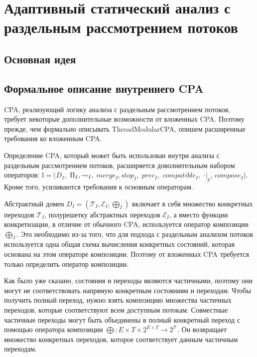 \newcommand{\IR}{IR}
\newcommand{\epp}{\mathrel{\bigoplus}}
\newcommand{\conctm}[1]{\conc{#1}_{TM}}

\section{Адаптивный статический анализ с раздельным рассмотрением потоков}
\label{sect_tm_with_io}

\subsection{Основная идея}

\subsection{Формальное описание внутреннего CPA}
 
CPA, реализующий логику анализа с раздельным рассмотрением потоков, требует некоторые дополнительные возможности от вложенных CPA. 
Поэтому прежде, чем формально описывать ThreadModularCPA, опишем расширенные требования ко вложенным CPA.
 
Определение CPA, который может быть использован внутри анализа с раздельным рассмотрением потоков, расширяется доволнительным набором операторов: $\mathbb{I}=(D_{I},$ $\Pi_{I}, \leadsto_{I},$ $merge_{I}, stop_{I},$ $prec_{I},$ $compatible_{I},$ $\cdot|_p$, $compose_I$).
Кроме того, усиливаются требования к основным операторам.

Абстрактный домен $D_I = (\mathcal{T}_I, \mathcal{E}_I, \epp_I)$ включает в себя множество конкретных переходов $\mathcal{T}_I$, полурешетку абстрактных переходов $\mathcal{E}_I$, а вместо функции конкретизации, в отличие от обычного CPA, используется оператор композиции $\epp_I$.
Это необходимо из-за того, что для подхода с раздельным анализом потоков используется одна общая схема вычисления конкретных состояний, которая основана на этом операторе композиции. 
Поэтому от вложенных CPA требуется только определить оператор композиции.

Как было уже сказано, состояния и переходы являются частичными, поэтому они могут не соответствовать напрямую конкретным состояниям и переходам. Чтобы получить полный переход, нужно взять композицию множества частичных переходов, которые соответствуют всем доступным потокам. Совместные частичные переходы могут быть объединены в полный конкретный переход с помощью оператора композиции $\epp: E \times T \times 2^{E \times T} \to 2^{\mathcal{T}}$.
Он возвращает множество конкретных переходов, которое соответствует данным частичным переходам.

